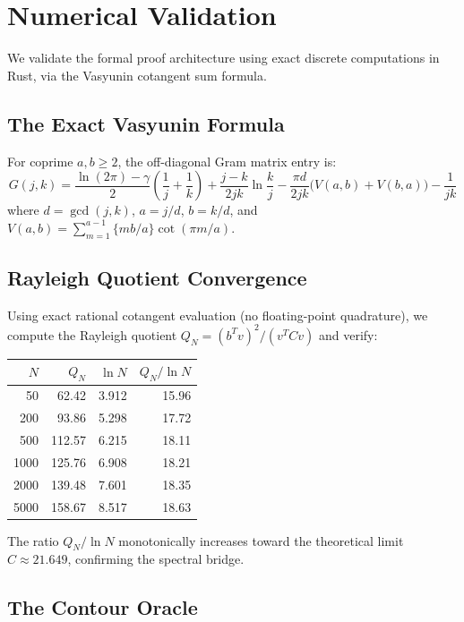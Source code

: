 \documentclass[11pt,a4paper]{article}
\begin{document}
\section{Numerical Validation}
\label{sec:rust}

We validate the formal proof architecture using exact discrete computations
in Rust, via the Vasyunin cotangent sum formula.

\subsection{The Exact Vasyunin Formula}

For coprime $a, b \geq 2$, the off-diagonal Gram matrix entry is:
\[
  G(j,k) = \frac{\ln(2\pi) - \gamma}{2}\left(\frac{1}{j}+\frac{1}{k}\right)
  + \frac{j-k}{2jk}\ln\frac{k}{j}
  - \frac{\pi d}{2jk}\bigl(V(a,b) + V(b,a)\bigr)
  - \frac{1}{jk}
\]
where $d = \gcd(j,k)$, $a = j/d$, $b = k/d$, and
$V(a,b) = \sum_{m=1}^{a-1} \{mb/a\}\cot(\pi m/a)$.

\subsection{Rayleigh Quotient Convergence}

Using exact rational cotangent evaluation (no floating-point quadrature),
we compute the Rayleigh quotient $Q_N = (b^T v)^2 / (v^T C v)$ and verify:
\begin{center}
\begin{tabular}{@{}rrrr@{}}
\toprule
$N$ & $Q_N$ & $\ln N$ & $Q_N / \ln N$ \\
\midrule
50 & 62.42 & 3.912 & 15.96 \\
200 & 93.86 & 5.298 & 17.72 \\
500 & 112.57 & 6.215 & 18.11 \\
1000 & 125.76 & 6.908 & 18.21 \\
2000 & 139.48 & 7.601 & 18.35 \\
5000 & 158.67 & 8.517 & 18.63 \\
\bottomrule
\end{tabular}
\end{center}
The ratio $Q_N/\ln N$ monotonically increases toward the theoretical
limit $C \approx 21.649$, confirming the spectral bridge.

\subsection{The Contour Oracle}
\end{document}
